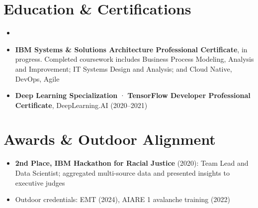 \documentclass[11pt,a4paper,sans]{moderncv}
\begin{document}
\section{Education \& Certifications}
\vspace{1pt}
\begin{itemize}

\item{}

\vspace{3pt}

\item \textbf{IBM Systems \& Solutions Architecture Professional Certificate}, in progress. Completed coursework includes Business Process Modeling, Analysis and Improvement; IT Systems Design and Analysis; and Cloud Native, DevOps, Agile

\item \textbf{Deep Learning Specialization} · \textbf{TensorFlow Developer Professional Certificate}, DeepLearning.AI (2020--2021)

\end{itemize}


\section{Awards \& Outdoor Alignment}
\vspace{1pt}
\begin{itemize}
\item \textbf{2nd Place, IBM Hackathon for Racial Justice} (2020): Team Lead and Data Scientist; aggregated multi-source data and presented insights to executive judges
\item Outdoor credentials: EMT (2024), AIARE 1 avalanche training (2022)
\end{itemize}
\end{document}
